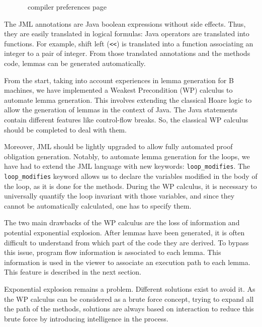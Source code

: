 \begin{figure}[p]
 \caption{\sc \JACK\ compiler preferences page}
 \label{JACKcompprefpage}
\end{figure}
 The JML annotations are Java boolean expressions without side
 effects.  Thus, they are easily translated in logical formulas: Java operators are
 translated into functions. For example, shift left (\texttt{<<}) is
 translated into a function associating an integer to a pair of
 integer.  From those translated annotations and the methods code,
 lemmas can be generated automatically.

 From the start, taking into account experiences in lemma generation
 for B machines, we have implemented a Weakest Precondition (WP)
 calculus to automate lemma generation. This involves extending the
 classical Hoare logic to allow the generation of lemmas in the
 context of Java.  The Java statements contain different features like
 control-flow breaks.  So, the classical WP calculus should be
 completed to deal with them.



 Moreover, JML should be lightly upgraded to allow fully automated
 proof obligation generation.  Notably, to automate lemma generation
 for the loops, we have had to extend the JML language with new
 keywords: \texttt{loop\_modifies}.  The \texttt{loop\_modifies}
 keyword allows us to declare the variables modified in the body of
 the loop, as it is done for the methods. During the WP calculus, it
 is necessary to universally quantify the loop invariant with those
 variables, and since they cannot be automatically calculated, one has
 to specify them.

 
 The two main drawbacks of the WP calculus are the loss of information and
 potential exponential explosion.  After lemmas have been generated,
 it is often difficult to understand from which part of the code they
 are derived.  To bypass this issue, program flow information is
 associated to each lemma.  This information is used in the viewer
 to associate an execution path to each lemma. This feature is described in the next section.

 Exponential explosion remains a problem.  Different solutions exist
 to avoid it.  As the WP calculus can be considered as a brute
 force concept, trying to expand all the path of the methods,
 solutions are always based on interaction to reduce this brute force
 by introducing intelligence in the process.

